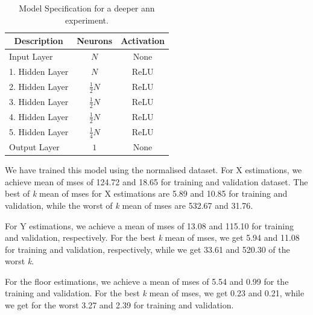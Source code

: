 \begin{table}[H]
    \centering
    \caption{Model Specification for a deeper \gls{ann} experiment.}
    \begin{tabular}{m{}m{} m{}}
        \hline
        \multicolumn{1}{c}{\textbf{Description}} & \multicolumn{1}{c}{\textbf{Neurons}} & \multicolumn{1}{c}{\textbf{Activation}}\\
        \hline
        
        Input Layer         &   \multicolumn{1}{c}{$N$} & \multicolumn{1}{c}{None}        \\
        1. Hidden Layer     &   \multicolumn{1}{c}{$N$}  & \multicolumn{1}{c}{ReLU}     \\
        2. Hidden Layer     &   \multicolumn{1}{c}{$\frac{1}{2}N$}  & \multicolumn{1}{c}{ReLU}     \\
        3. Hidden Layer         &   \multicolumn{1}{c}{$\frac{1}{2}N$} & \multicolumn{1}{c}{ReLU}        \\
        4. Hidden Layer         &   \multicolumn{1}{c}{$\frac{1}{2}N$} & \multicolumn{1}{c}{ReLU}        \\
        5. Hidden Layer         &   \multicolumn{1}{c}{$\frac{1}{4}N$} & \multicolumn{1}{c}{ReLU}        \\
        Output Layer     &   \multicolumn{1}{c}{$1$}  & \multicolumn{1}{c}{None}     \\
        \hline
    \end{tabular}
    \label{tab:NN02}
\end{table}

We have trained this model using the normalised dataset. For X estimations, we achieve mean of \gls{mse}s of 124.72 and 18.65 for training and validation dataset. The best of \textit{k} mean of \gls{mse}s for X estimations are 5.89 and 10.85 for training and validation, while the worst of \textit{k} mean of \gls{mse}s are 532.67 and 31.76.

For Y estimations, we achieve a mean of \gls{mse}s of 13.08 and 115.10 for training and validation, respectively. For the best \textit{k} mean of \gls{mse}s, we get 5.94 and 11.08 for training and validation, respectively, while we get 33.61 and 520.30 of the worst \textit{k}.

For the floor estimations, we achieve a mean of \gls{mse}s of 5.54 and 0.99 for the training and validation. For the best \textit{k} mean of \gls{mse}s, we get 0.23 and 0.21, while we get for the worst 3.27 and 2.39 for training and validation.

